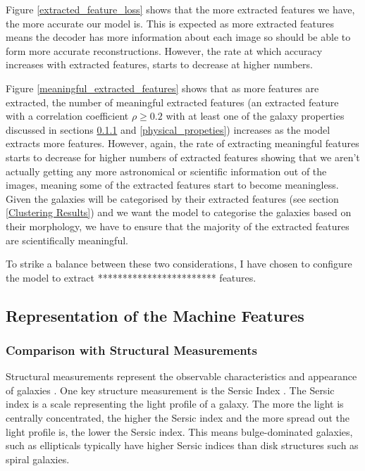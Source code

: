 \documentclass[12pt, onecolumn]{article}
\begin{document}
    
    Figure \ref{extracted_feature_loss} shows that the more extracted features we have, the more accurate our model is. This is expected as more extracted features means the decoder has more information about each image so should be able to form more accurate reconstructions. However, the rate at which accuracy increases with extracted features, starts to decrease at higher numbers.

    Figure \ref{meaningful_extracted_features} shows that as more features are extracted, the number of meaningful extracted features (an extracted feature with a correlation coefficient $\rho \geq 0.2$ with at least one of the galaxy properties discussed in sections \ref{structual_measurements} and \ref{physical_propeties}) increases as the model extracts more features. However, again, the rate of extracting meaningful features starts to decrease for higher numbers of extracted features showing that we aren't actually getting any more astronomical or scientific information out of the images, meaning some of the extracted features start to become meaningless. Given the galaxies will be categorised by their extracted features (see section \ref{Clustering Results}) and we want the model to categorise the galaxies based on their morphology, we have to ensure that the majority of the extracted features are scientifically meaningful.

    To strike a balance between these two considerations, I have chosen to configure the model to extract ************************ features.


    \subsection{Representation of the Machine Features}
    \label{Representation of the Machine Features}

    
        \subsubsection{Comparison with Structural Measurements}
        \label{structual_measurements}

        Structural measurements represent the observable characteristics and appearance of galaxies \cite{structure_measurement}. One key structure measurement is the Sersic Index \cite{sersic_index}. The Sersic index is a scale representing the light profile of a galaxy. The more the light is centrally concentrated, the higher the Sersic index and the more spread out the light profile is, the lower the Sersic index. This means bulge-dominated galaxies, such as ellipticals typically have higher Sersic indices than disk structures such as spiral galaxies.
        
\end{document}
